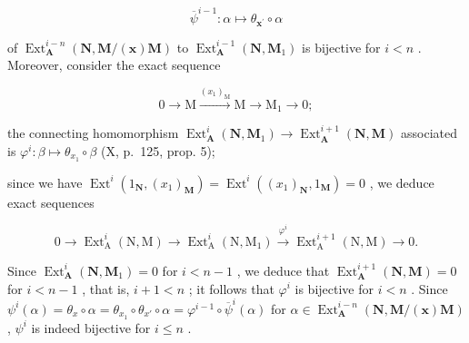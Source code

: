 \[
\overline {{{{\psi}}}} ^ {i - 1}: \alpha \mapsto \theta_ {\boldsymbol {x} ^ {\prime}} \circ \alpha
\]

of \(\operatorname{Ext}_{\mathbf{A}}^{i-n}(\mathbf{N}, \mathbf{M}/(\mathbf{x})\mathbf{M})\) to \(\operatorname{Ext}_{\mathbf{A}}^{i-1}(\mathbf{N}, \mathbf{M}_1)\) is bijective for \(i < n\) . Moreover, consider the exact sequence

\[
0 \longrightarrow \mathrm{M} \xrightarrow {(x _ {1}) _ {\mathrm{M}}} \mathrm{M} \longrightarrow \mathrm{M} _ {1} \longrightarrow 0;
\]

the connecting homomorphism \(\operatorname{Ext}_{\mathbf{A}}^{i}(\mathbf{N}, \mathbf{M}_{1}) \to \operatorname{Ext}_{\mathbf{A}}^{i+1}(\mathbf{N}, \mathbf{M})\) associated is \(\varphi^{i}: \beta \mapsto \theta_{x_{1}} \circ \beta\) (X, p.~125, prop. 5);

since we have \(\operatorname{Ext}^i(1_{\mathbf{N}}, (x_1)_{\mathbf{M}}) = \operatorname{Ext}^i((x_1)_{\mathbf{N}}, 1_{\mathbf{M}}) = 0\) , we deduce exact sequences

\[
0 \longrightarrow \operatorname{Ext} _ {\mathrm{A}} ^ {i} (\mathrm{N}, \mathrm{M}) \longrightarrow \operatorname{Ext} _ {\mathrm{A}} ^ {i} (\mathrm{N}, \mathrm{M} _ {1}) \xrightarrow {\varphi^ {i}} \operatorname{Ext} _ {\mathrm{A}} ^ {i + 1} (\mathrm{N}, \mathrm{M}) \longrightarrow 0.
\]

Since \(\operatorname{Ext}_{\mathbf{A}}^{i}(\mathbf{N}, \mathbf{M}_{1}) = 0\) for \(i < n - 1\) , we deduce that \(\operatorname{Ext}_{\mathbf{A}}^{i + 1}(\mathbf{N}, \mathbf{M}) = 0\) for \(i < n - 1\) , that is, \(i + 1 < n\) ; it follows that \(\varphi^{i}\) is bijective for \(i < n\) . Since \(\psi^{i}(\alpha) = \theta_{x} \circ \alpha = \theta_{x_{1}} \circ \theta_{x'} \circ \alpha = \varphi^{i - 1} \circ \overline{\psi}^{i}(\alpha)\) for \(\alpha \in \operatorname{Ext}_{\mathbf{A}}^{i - n}(\mathbf{N}, \mathbf{M}/(\mathbf{x})\mathbf{M})\) , \(\psi^{i}\) is indeed bijective for \(i \leqslant n\) .

\backmatter
{}
